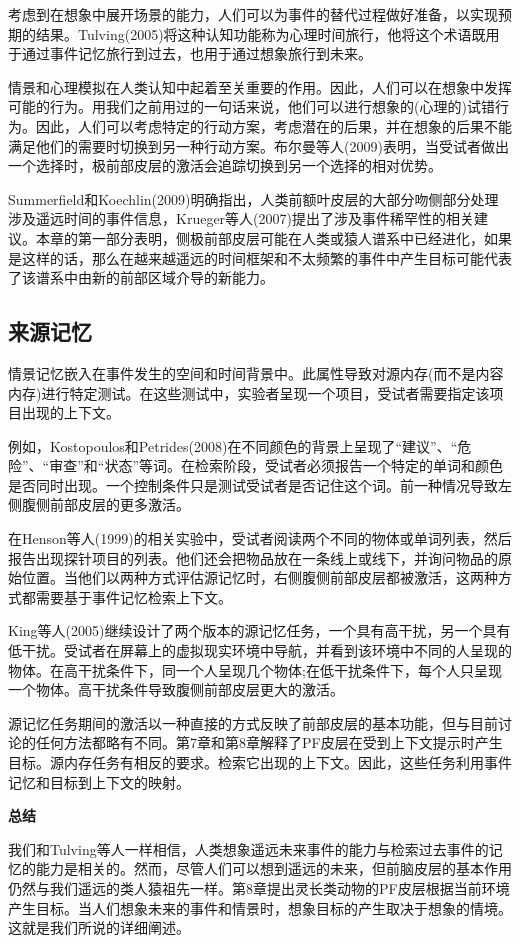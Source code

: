 考虑到在想象中展开场景的能力，人们可以为事件的替代过程做好准备，以实现预期的结果。Tulving(2005)将这种认知功能称为心理时间旅行，他将这个术语既用于通过事件记忆旅行到过去，也用于通过想象旅行到未来。

情景和心理模拟在人类认知中起着至关重要的作用。因此，人们可以在想象中发挥可能的行为。用我们之前用过的一句话来说，他们可以进行想象的(心理的)试错行为。因此，人们可以考虑特定的行动方案，考虑潜在的后果，并在想象的后果不能满足他们的需要时切换到另一种行动方案。布尔曼等人(2009)表明，当受试者做出一个选择时，极前部皮层的激活会追踪切换到另一个选择的相对优势。

Summerfield和Koechlin(2009)明确指出，人类前额叶皮层的大部分吻侧部分处理涉及遥远时间的事件信息，Krueger等人(2007)提出了涉及事件稀罕性的相关建议。本章的第一部分表明，侧极前部皮层可能在人类或猿人谱系中已经进化，如果是这样的话，那么在越来越遥远的时间框架和不太频繁的事件中产生目标可能代表了该谱系中由新的前部区域介导的新能力。

\subsection{来源记忆}
情景记忆嵌入在事件发生的空间和时间背景中。此属性导致对源内存(而不是内容内存)进行特定测试。在这些测试中，实验者呈现一个项目，受试者需要指定该项目出现的上下文。

例如，Kostopoulos和Petrides(2008)在不同颜色的背景上呈现了“建议”、“危险”、“审查”和“状态”等词。在检索阶段，受试者必须报告一个特定的单词和颜色是否同时出现。一个控制条件只是测试受试者是否记住这个词。前一种情况导致左侧腹侧前部皮层的更多激活。

在Henson等人(1999)的相关实验中，受试者阅读两个不同的物体或单词列表，然后报告出现探针项目的列表。他们还会把物品放在一条线上或线下，并询问物品的原始位置。当他们以两种方式评估源记忆时，右侧腹侧前部皮层都被激活，这两种方式都需要基于事件记忆检索上下文。

King等人(2005)继续设计了两个版本的源记忆任务，一个具有高干扰，另一个具有低干扰。受试者在屏幕上的虚拟现实环境中导航，并看到该环境中不同的人呈现的物体。在高干扰条件下，同一个人呈现几个物体;在低干扰条件下，每个人只呈现一个物体。高干扰条件导致腹侧前部皮层更大的激活。

源记忆任务期间的激活以一种直接的方式反映了前部皮层的基本功能，但与目前讨论的任何方法都略有不同。第7章和第8章解释了PF皮层在受到上下文提示时产生目标。源内存任务有相反的要求。检索它出现的上下文。因此，这些任务利用事件记忆和目标到上下文的映射。

\textbf{总结}

我们和Tulving等人一样相信，人类想象遥远未来事件的能力与检索过去事件的记忆的能力是相关的。然而，尽管人们可以想到遥远的未来，但前脑皮层的基本作用仍然与我们遥远的类人猿祖先一样。第8章提出灵长类动物的PF皮层根据当前环境产生目标。当人们想象未来的事件和情景时，想象目标的产生取决于想象的情境。这就是我们所说的详细阐述。

